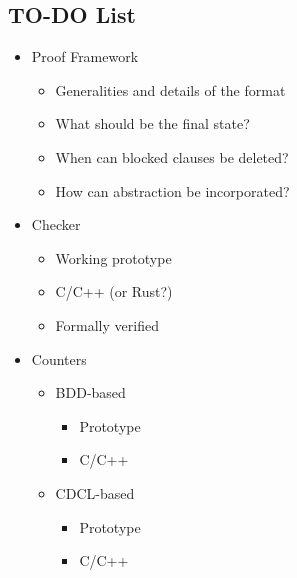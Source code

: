 \documentclass{llncs}
\begin{document}
\subsection{TO-DO List}

\begin{itemize}
\item Proof Framework
  \begin{itemize}
  \item Generalities and details of the format
  \item What should be the final state?
  \item When can blocked clauses be deleted?
  \item How can abstraction be incorporated?
  \end{itemize}

\item Checker
  \begin{itemize}
  \item Working prototype
  \item C/C++ (or Rust?)
  \item Formally verified
  \end{itemize}

\item Counters
\begin{itemize}
\item BDD-based
  \begin{itemize}
  \item Prototype
  \item C/C++
  \end{itemize}

\item CDCL-based
  \begin{itemize}
  \item Prototype
  \item C/C++
  \end{itemize}
\end{itemize}

\end{itemize}



\end{document}
